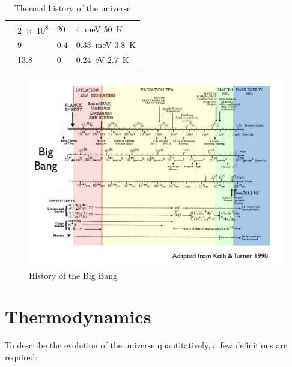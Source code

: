\begin{table}
\begin{tabu}{m{10cm}llp{2cm}}
	 & \SI{2e8}{\year} & \num{20} & \SI{4}{\meV} \newline \SI{50}{\kelvin}\\
	 & \SI{9}{\giga\year} & \num{0.4} & \SI{0.33}{\meV} \newline \SI{3.8}{\kelvin}\\
	 & \SI{13.8}{\giga\year} & \num{0} & \SI{0.24}{\eV} \newline \SI{2.7}{\kelvin}\\
	\bottomrule
	\end{tabu}
	\caption{Thermal history of the universe}
	\label{tab:thermal-history}
\end{table}

\begin{figure}
	\centering
	\includegraphics[width=\textwidth]{img/ch-02/big-bang.png}
	\caption{History of the Big Bang}
	\label{fig:big-bang}
\end{figure}

\section{Thermodynamics}

To describe the evolution of the universe quantitatively, a few definitions are required:

